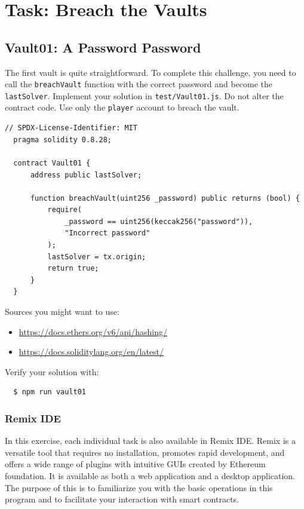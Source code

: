 \documentclass[12pt]{article}
\begin{document}
\section{Task: Breach the Vaults}
\subsection*{Vault01: A Password Password}
The first vault is quite straightforward. To complete this challenge, you need to call the \texttt{breachVault} function with the correct password and become the \texttt{lastSolver}. Implement your solution in \texttt{test/Vault01.js}. Do not alter the contract code. Use only the \texttt{player} account to breach the vault.

\begin{lstlisting}[language=Solidity]
  // SPDX-License-Identifier: MIT
  pragma solidity 0.8.28;
  
  contract Vault01 {
      address public lastSolver;
  
      function breachVault(uint256 _password) public returns (bool) {
          require(
              _password == uint256(keccak256("password")),
              "Incorrect password"
          );
          lastSolver = tx.origin;
          return true;
      }
  }  
\end{lstlisting}

\medskip
\noindent
Sources you might want to use:
\begin{itemize}
  \item \href{https://docs.ethers.org/v6/api/hashing/}{https://docs.ethers.org/v6/api/hashing/}
  \item \href{https://docs.soliditylang.org/en/latest/}{https://docs.soliditylang.org/en/latest/}
\end{itemize}

\medskip
\noindent
Verify your solution with:
\begin{verbatim}
  $ npm run vault01
\end{verbatim}

\subsubsection*{Remix IDE}

In this exercise, each individual task is also available in Remix IDE. Remix is a versatile tool that requires no installation, promotes rapid development, and offers a wide range of plugins with intuitive GUIs created by Ethereum foundation. It is available as both a web application and a desktop application. The purpose of this is to familiarize you with the basic operations in this program and to facilitate your interaction with smart contracts.
\end{document}
